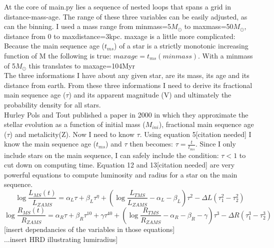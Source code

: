 \documentclass[a4paper,10pt]{article}
\begin{document}
 At the core of main.py lies a sequence of nested loops that spans a grid in distance-mass-age. The range of these three
 variables can be easily adjusted, as can the binning. I used a mass range from minmass=5$M_\odot$ to maxmass=50$M_\odot$, distance 
 from 0 to maxdistance=3kpc. maxage is a little more complicated: Because the main sequence age ($t_{ms}$) of a star is a strictly 
 monotonic increasing function of M the following is true: $maxage=t_{ms}(minmass)$. With a minmass of 5$M_\odot$ this translates 
 to maxage=104Myr\\
 The three informations I have about any given star, are its mass, its age and its distance from earth. From these three informations
 I need to derive its fractional main sequence age ($\tau$) and its apparent magnitude (V) and ultimately the probability density
 for all stars.\\ 
 Hurley Pols and Tout published a paper in 2000 in which they approximate the stellar evolution as a function of initial mass ($M_{ini}$),
 fractional main sequence age ($\tau$) and metalicity(Z). Now I need to know $\tau$. Using equation 5[citation needed] I know the 
 main sequence age 
 ($t_{ms}$) and $\tau$ then becomes: $\tau=\frac{t}{t_{ms}}$. Since I only include stars on the main sequence, I can safely include
 the condition: $\tau<1$ to cut down on computing time.
 Equation 12 and 13[citation needed] are very powerful equations to compute luminosity
 and radius for a star on the main sequence.
 \begin{equation}
  \log\frac{L_{MS}(t)}{L_{ZAMS}}=\alpha_L\tau+\beta_L\tau^\eta+\left(\log\frac{L_{TMS}}{L_{ZAMS}}-\alpha_L-\beta_L\right)\tau^2-\Delta L(\tau_1^2-\tau_2^2)
  \label{logL}
 \end{equation}
 \begin{equation}
  \log\frac{R_{MS}(t)}{R_{ZAMS}}=\alpha_R\tau+\beta_R\tau^{10}+\gamma\tau^{40}+\left(\log\frac{R_{TMS}}{R_{ZAMS}}-\alpha_R-\beta_R-\gamma\right)\tau^3-\Delta R(\tau_1^3-\tau_2^3)
  \label{logR}
 \end{equation}
 [insert dependancies of the variables in those equations]\\
 ...insert HRD illustrating lumiradius]\\
 
\end{document}

